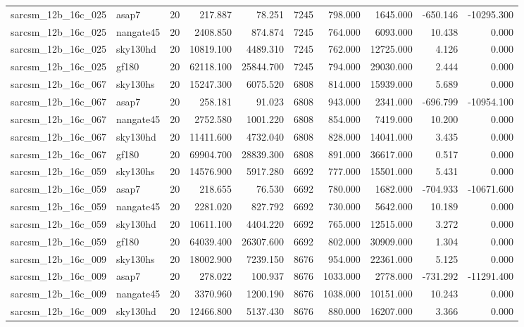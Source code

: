 \begin{longtable}{llrrrrrrrr}
sarcsm\_12b\_16c\_025 & asap7 & 20 & 217.887 & 78.251 & 7245 & 798.000 & 1645.000 & -650.146 & -10295.300 \\
sarcsm\_12b\_16c\_025 & nangate45 & 20 & 2408.850 & 874.874 & 7245 & 764.000 & 6093.000 & 10.438 & 0.000 \\
sarcsm\_12b\_16c\_025 & sky130hd & 20 & 10819.100 & 4489.310 & 7245 & 762.000 & 12725.000 & 4.126 & 0.000 \\
sarcsm\_12b\_16c\_025 & gf180 & 20 & 62118.100 & 25844.700 & 7245 & 794.000 & 29030.000 & 2.444 & 0.000 \\
sarcsm\_12b\_16c\_067 & sky130hs & 20 & 15247.300 & 6075.520 & 6808 & 814.000 & 15939.000 & 5.689 & 0.000 \\
sarcsm\_12b\_16c\_067 & asap7 & 20 & 258.181 & 91.023 & 6808 & 943.000 & 2341.000 & -696.799 & -10954.100 \\
sarcsm\_12b\_16c\_067 & nangate45 & 20 & 2752.580 & 1001.220 & 6808 & 854.000 & 7419.000 & 10.200 & 0.000 \\
sarcsm\_12b\_16c\_067 & sky130hd & 20 & 11411.600 & 4732.040 & 6808 & 828.000 & 14041.000 & 3.435 & 0.000 \\
sarcsm\_12b\_16c\_067 & gf180 & 20 & 69904.700 & 28839.300 & 6808 & 891.000 & 36617.000 & 0.517 & 0.000 \\
sarcsm\_12b\_16c\_059 & sky130hs & 20 & 14576.900 & 5917.280 & 6692 & 777.000 & 15501.000 & 5.431 & 0.000 \\
sarcsm\_12b\_16c\_059 & asap7 & 20 & 218.655 & 76.530 & 6692 & 780.000 & 1682.000 & -704.933 & -10671.600 \\
sarcsm\_12b\_16c\_059 & nangate45 & 20 & 2281.020 & 827.792 & 6692 & 730.000 & 5642.000 & 10.189 & 0.000 \\
sarcsm\_12b\_16c\_059 & sky130hd & 20 & 10611.100 & 4404.220 & 6692 & 765.000 & 12515.000 & 3.272 & 0.000 \\
sarcsm\_12b\_16c\_059 & gf180 & 20 & 64039.400 & 26307.600 & 6692 & 802.000 & 30909.000 & 1.304 & 0.000 \\
sarcsm\_12b\_16c\_009 & sky130hs & 20 & 18002.900 & 7239.150 & 8676 & 954.000 & 22361.000 & 5.125 & 0.000 \\
sarcsm\_12b\_16c\_009 & asap7 & 20 & 278.022 & 100.937 & 8676 & 1033.000 & 2778.000 & -731.292 & -11291.400 \\
sarcsm\_12b\_16c\_009 & nangate45 & 20 & 3370.960 & 1200.190 & 8676 & 1038.000 & 10151.000 & 10.243 & 0.000 \\
sarcsm\_12b\_16c\_009 & sky130hd & 20 & 12466.800 & 5137.430 & 8676 & 880.000 & 16207.000 & 3.366 & 0.000 \\

\end{longtable}
